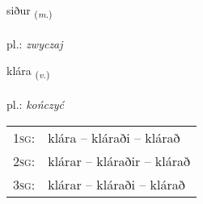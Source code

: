 \documentclass[frontgrid, backgrid]{flacards}\usepackage[]{graphicx}\usepackage[]{xcolor}
\begin{document}
\renewcommand{\flhead}{\vskip5pt \fboxsep=0pt {\small\bfseries\footnotesize Nafnorð | Noun}}
\renewcommand{\fcfoot}{\vskip5pt \fboxsep=0pt \hspace{2pt}{\small\bfseries\footnotesize 2K}}

\renewcommand{\blhead}{\vskip5pt {\small\bfseries\footnotesize Nafnorð | Noun }}
\renewcommand{\bcfoot}{\vskip5pt \hspace{2pt}{\small\bfseries\footnotesize 2K}}


{siður \small{\textsubscript{(\textit{m.})}} \\[1ex] %
\textphonetic{[sɪːðʏr]} \\
pl.: \emph{zwyczaj} \\  [2ex]
\renewcommand*{\arraystretch}{0.8}
}

\renewcommand{\flhead}{\vskip5pt \fboxsep=0pt {\small\bfseries\footnotesize Sagnorð | Verb}}
\renewcommand{\fcfoot}{\vskip5pt \fboxsep=0pt \hspace{2pt}{\small\bfseries\footnotesize 2K}}

\renewcommand{\blhead}{\vskip5pt {\small\bfseries\footnotesize Sagnorð | Verb }}
\renewcommand{\bcfoot}{\vskip5pt \hspace{2pt}{\small\bfseries\footnotesize 2K}}


{klára \small{\textsubscript{(\textit{v.})}} \\[1ex] %
\textphonetic{[kʰlauːra]} \\
pl.: \emph{kończyć} \\  [2ex]
\renewcommand*{\arraystretch}{0.8}
\begin{tabular}{p{1cm}l}
\textsc{1sg}: & klára -- kláraði -- klárað \\ 
\textsc{2sg}: & klárar -- kláraðir -- klárað \\ 
\textsc{3sg}: & klárar -- kláraði -- klárað \\ 
\end{tabular}
}
\end{document}
